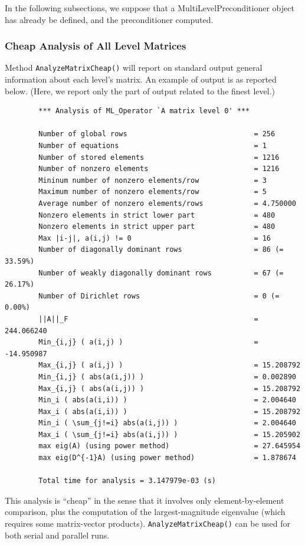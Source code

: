 \documentclass{article}[11pt]
\begin{document}
In the following subsections, we suppose that a MultiLevelPreconditioner 
object has already be defined,
and the preconditioner computed. 


\subsubsection{Cheap Analysis of All Level Matrices}

Method \verb!AnalyzeMatrixCheap()! will
report on standard output general information about each level's matrix. An
example of output is as reported below. (Here, we report only the part of output
related to the finest level.)
\begin{verbatim}
        *** Analysis of ML_Operator `A matrix level 0' ***

        Number of global rows                              = 256
        Number of equations                                = 1
        Number of stored elements                          = 1216
        Number of nonzero elements                         = 1216
        Mininum number of nonzero elements/row             = 3
        Maximum number of nonzero elements/row             = 5
        Average number of nonzero elements/rows            = 4.750000
        Nonzero elements in strict lower part              = 480
        Nonzero elements in strict upper part              = 480
        Max |i-j|, a(i,j) != 0                             = 16
        Number of diagonally dominant rows                 = 86 (= 33.59%)
        Number of weakly diagonally dominant rows          = 67 (= 26.17%)
        Number of Dirichlet rows                           = 0 (=  0.00%)
        ||A||_F                                            = 244.066240
        Min_{i,j} ( a(i,j) )                               = -14.950987
        Max_{i,j} ( a(i,j) )                               = 15.208792
        Min_{i,j} ( abs(a(i,j)) )                          = 0.002890
        Max_{i,j} ( abs(a(i,j)) )                          = 15.208792
        Min_i ( abs(a(i,i)) )                              = 2.004640
        Max_i ( abs(a(i,i)) )                              = 15.208792
        Min_i ( \sum_{j!=i} abs(a(i,j)) )                  = 2.004640
        Max_i ( \sum_{j!=i} abs(a(i,j)) )                  = 15.205902
        max eig(A) (using power method)                    = 27.645954
        max eig(D^{-1}A) (using power method)              = 1.878674

        Total time for analysis = 3.147979e-03 (s)
\end{verbatim}
This analysis is ``cheap'' in the sense that it involves only element-by-element
comparison, plus the computation of the largest-magnitude eigenvalue (which
requires some matrix-vector products). \verb!AnalyzeMatrixCheap()! can be used
for both serial and parallel runs.
\end{document}
